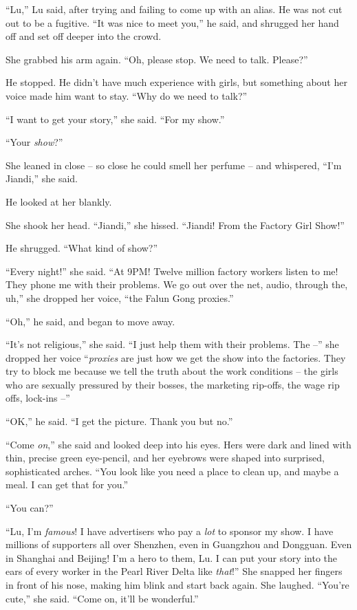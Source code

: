 ``Lu,'' Lu said, after trying and failing to come up with an alias.
He was not cut out to be a fugitive. ``It was nice to meet you,'' he
said, and shrugged her hand off and set off deeper into the crowd.

She grabbed his arm again. ``Oh, please stop. We need to talk.
Please?''

He stopped. He didn't have much experience with girls, but
something about her voice made him want to stay. ``Why do we need to
talk?''

``I want to get your story,'' she said. ``For my show.''

``Your \emph{show}?''

She leaned in close -- so close he could smell her perfume -- and
whispered, ``I'm Jiandi,'' she said.

He looked at her blankly.

She shook her head. ``Jiandi,'' she hissed. ``Jiandi! From the Factory
Girl Show!''

He shrugged. ``What kind of show?''

``Every night!'' she said. ``At 9PM! Twelve million factory workers
listen to me! They phone me with their problems. We go out over the
net, audio, through the, uh,'' she dropped her voice, ``the Falun
Gong proxies.''

``Oh,'' he said, and began to move away.

``It's not religious,'' she said. ``I just help them with their
problems. The --'' she dropped her voice ``\emph{proxies} are just
how we get the show into the factories. They try to block me
because we tell the truth about the work conditions -- the girls
who are sexually pressured by their bosses, the marketing rip-offs,
the wage rip offs, lock-ins --''

``OK,'' he said. ``I get the picture. Thank you but no.''

``Come \emph{on},'' she said and looked deep into his eyes. Hers were
dark and lined with thin, precise green eye-pencil, and her
eyebrows were shaped into surprised, sophisticated arches. ``You
look like you need a place to clean up, and maybe a meal. I can get
that for you.''

``You can?''

``Lu, I'm \emph{famous}! I have advertisers who pay a \emph{lot} to
sponsor my show. I have millions of supporters all over Shenzhen,
even in Guangzhou and Dongguan. Even in Shanghai and Beijing! I'm a
hero to them, Lu. I can put your story into the ears of every
worker in the Pearl River Delta like \emph{that}!'' She snapped her
fingers in front of his nose, making him blink and start back
again. She laughed. ``You're cute,'' she said. ``Come on, it'll be
wonderful.''

